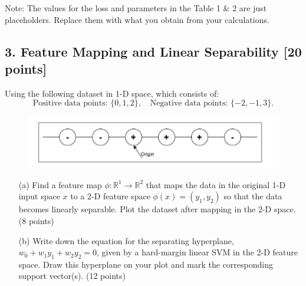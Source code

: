 \documentclass[a3paper,12pt]{article} %
\begin{document}
Note: The values for the loss and parameters in the Table 1 \& 2 are just placeholders. Replace them with what you obtain from your calculations.


\vspace{30pt}
\subsection*{3. Feature Mapping and Linear Separability [20 points]}

Using the following dataset in 1-D space, which consists of:
\[
\text{Positive data points: } \{0, 1, 2\}, \quad \text{Negative data points: } \{-2, -1, 3\}.
\]

\begin{figure}[h!]
    \centering
    \includegraphics[width=0.5\linewidth]{drawio.png}
    \label{fig:enter-label}
\end{figure}


\begin{enumerate}
    \item[(a)] Find a feature map $\phi : \mathbb{R}^1 \to \mathbb{R}^2$ that maps the data in the original 1-D input space $x$ to a 2-D feature space $\phi(x) = (y_1, y_2)$ so that the data becomes linearly separable. Plot the dataset after mapping in the 2-D space. \hfill (8 points)

    
    
    \item[(b)] Write down the equation for the separating hyperplane, 
    \(
    w_0 + w_1y_1 + w_2y_2 = 0
    \),
    given by a hard-margin linear SVM in the 2-D feature space. Draw this hyperplane on your plot and mark the corresponding support vector(s). \hfill (12 points)
\end{enumerate}
\end{document}
